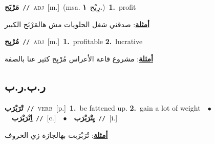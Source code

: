 \documentclass[10pt,a4paper,twoside]{article} %
\begin{document}
\begin{multicols}{2}
{\setlength\topsep{0pt}\textbf{\foreignlanguage{arabic}{مَرْبَح}}\ {\color{gray}\texttt{//}\color{black}}\ \textsc{adj}\ [m.]\ \color{gray}(msa. \foreignlanguage{arabic}{رِبْح}~\foreignlanguage{arabic}{\textbf{١.}})\color{black}\ \textbf{1.}~profit\  \begin{flushright}\color{gray}\foreignlanguage{arabic}{\textbf{\underline{\foreignlanguage{arabic}{أمثلة}}}: صدقني شغل الحلويات مش هالمَرْبَح الكبير}\end{flushright}\color{black}} \vspace{2mm}

{\setlength\topsep{0pt}\textbf{\foreignlanguage{arabic}{مُرْبِح}}\ {\color{gray}\texttt{//}\color{black}}\ \textsc{adj}\ [m.]\ \textbf{1.}~profitable  \textbf{2.}~lucrative\  \begin{flushright}\color{gray}\foreignlanguage{arabic}{\textbf{\underline{\foreignlanguage{arabic}{أمثلة}}}: مشروع قاعة الأعراس مُرْبِح كثير عنا بالصفة}\end{flushright}\color{black}} \vspace{2mm}

\vspace{-3mm}
\subsection*{\color{blue}\foreignlanguage{arabic}{ر.ب.ر.ب}\color{blue}{}} 

{\setlength\topsep{0pt}\textbf{\foreignlanguage{arabic}{تْرَبْرَب}}\ {\color{gray}\texttt{//}\color{black}}\ \textsc{verb}\ [p.]\ \textbf{1.}~be fattened up.  \textbf{2.}~gain a lot of weight\ \ $\bullet$\ \ \setlength\topsep{0pt}\textbf{\foreignlanguage{arabic}{اِتْرَبْرَب}}\ {\color{gray}\texttt{//}\color{black}}\ [c.]\ \ $\bullet$\ \ \setlength\topsep{0pt}\textbf{\foreignlanguage{arabic}{يِتْرَبْرَب}}\ {\color{gray}\texttt{//}\color{black}}\ [i.]\  \begin{flushright}\color{gray}\foreignlanguage{arabic}{\textbf{\underline{\foreignlanguage{arabic}{أمثلة}}}: تْرَبْرَبت بهالجازة زي الخروف}\end{flushright}\color{black}} \vspace{2mm}


\end{multicols}
\end{document}

